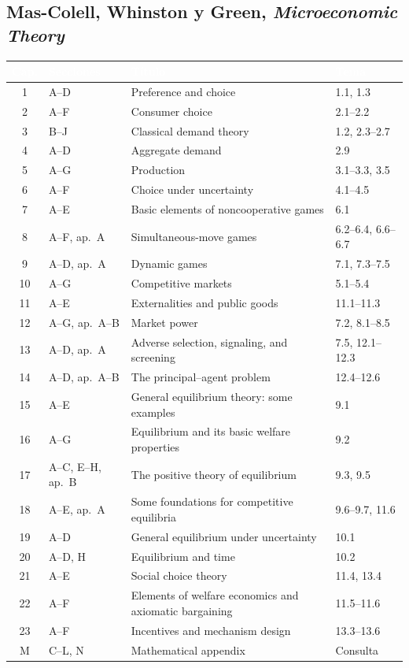 \documentclass[11pt,a4paper]{article}
\newcommand{\cab}[1]{\textcolor{white}{\sffamily\bfseries #1}}
\newcommand{\filasalternas}{\rowcolors{2}{white}{tonoPalido}}
\begin{document}
\subsection*{Mas-Colell, Whinston y Green, \emph{Microeconomic Theory}}
{\small\filasalternas
\noindent\begin{tabularx}{\textwidth}{clXl}
\toprule
\rowcolor{tonoOscuro}\cab{Cap.} & \cab{Secciones} & \cab{Título} & \cab{Tema} \\
\midrule
1 & A--D & Preference and choice & 1.1, 1.3 \\
2 & A--F & Consumer choice & 2.1--2.2 \\
3 & B--J & Classical demand theory & 1.2, 2.3--2.7 \\
4 & A--D & Aggregate demand & 2.9 \\
5 & A--G & Production & 3.1--3.3, 3.5 \\
6 & A--F & Choice under uncertainty & 4.1--4.5 \\
7 & A--E & Basic elements of noncooperative games & 6.1 \\
8 & A--F, ap.~A & Simultaneous-move games & 6.2--6.4, 6.6--6.7 \\
9 & A--D, ap.~A & Dynamic games & 7.1, 7.3--7.5 \\
10 & A--G & Competitive markets & 5.1--5.4 \\
11 & A--E & Externalities and public goods & 11.1--11.3 \\
12 & A--G, ap.~A--B & Market power & 7.2, 8.1--8.5 \\
13 & A--D, ap.~A & Adverse selection, signaling, and screening & 7.5, 12.1--12.3 \\
14 & A--D, ap.~A--B & The principal--agent problem & 12.4--12.6 \\
15 & A--E & General equilibrium theory: some examples & 9.1 \\
16 & A--G & Equilibrium and its basic welfare properties & 9.2 \\
17 & A--C, E--H, ap.~B & The positive theory of equilibrium & 9.3, 9.5 \\
18 & A--E, ap.~A & Some foundations for competitive equilibria & 9.6--9.7, 11.6 \\
19 & A--D & General equilibrium under uncertainty & 10.1 \\
20 & A--D, H & Equilibrium and time & 10.2 \\
21 & A--E & Social choice theory & 11.4, 13.4 \\
22 & A--F & Elements of welfare economics and axiomatic bargaining & 11.5--11.6 \\
23 & A--F & Incentives and mechanism design & 13.3--13.6 \\
M & C--L, N & Mathematical appendix & Consulta \\
\bottomrule
\end{tabularx}
}
\end{document}
